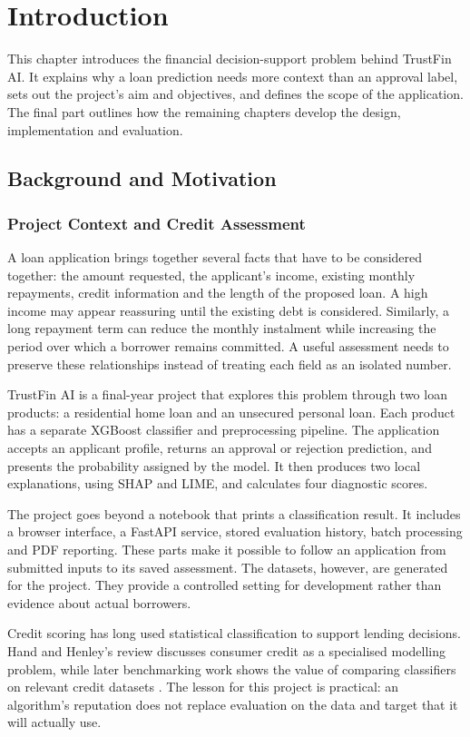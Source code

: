 \chapter[INTRODUCTION]{Introduction}

This chapter introduces the financial decision-support problem behind TrustFin AI. It explains why a loan prediction needs more context than an approval label, sets out the project's aim and objectives, and defines the scope of the application. The final part outlines how the remaining chapters develop the design, implementation and evaluation.

\section{Background and Motivation}
\subsection{Project Context and Credit Assessment}
A loan application brings together several facts that have to be considered together: the amount requested, the applicant's income, existing monthly repayments, credit information and the length of the proposed loan. A high income may appear reassuring until the existing debt is considered. Similarly, a long repayment term can reduce the monthly instalment while increasing the period over which a borrower remains committed. A useful assessment needs to preserve these relationships instead of treating each field as an isolated number.

TrustFin AI is a final-year project that explores this problem through two loan products: a residential home loan and an unsecured personal loan. Each product has a separate XGBoost classifier and preprocessing pipeline. The application accepts an applicant profile, returns an approval or rejection prediction, and presents the probability assigned by the model. It then produces two local explanations, using SHAP and LIME, and calculates four diagnostic scores.

The project goes beyond a notebook that prints a classification result. It includes a browser interface, a FastAPI service, stored evaluation history, batch processing and PDF reporting. These parts make it possible to follow an application from submitted inputs to its saved assessment. The datasets, however, are generated for the project. They provide a controlled setting for development rather than evidence about actual borrowers.

Credit scoring has long used statistical classification to support lending decisions. Hand and Henley's review discusses consumer credit as a specialised modelling problem, while later benchmarking work shows the value of comparing classifiers on relevant credit datasets \cite{handHenley1997,lessmann2015}. The lesson for this project is practical: an algorithm's reputation does not replace evaluation on the data and target that it will actually use.

